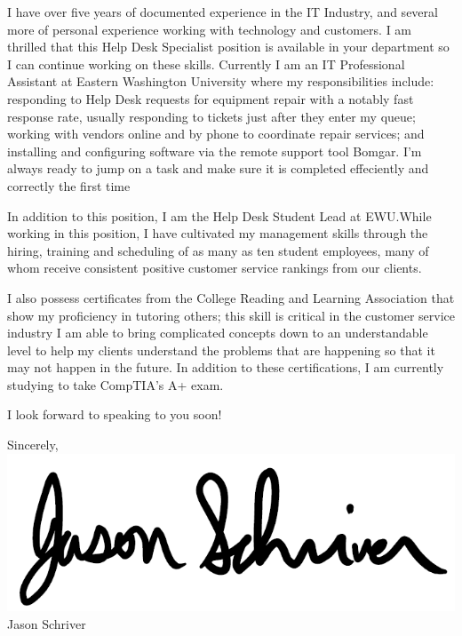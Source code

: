 \documentclass[a4paper,10pt]{article}
\begin{document}
\par
I have over five years of documented experience in the IT Industry, and several more of personal experience working with technology and customers. I am thrilled that this Help Desk Specialist position is available in your department so I can continue working on these skills. Currently I am an IT Professional Assistant at Eastern Washington University where my responsibilities include: responding to Help Desk requests for equipment repair with a notably fast response rate, usually responding to tickets just after they enter my queue; working with vendors online and by phone to coordinate repair services; and installing and configuring software via the remote support tool Bomgar. I'm always ready to jump on a task and make sure it is completed effeciently and correctly the first time
\par
In addition to this position, I am the Help Desk Student Lead at EWU.While working in this position, I have cultivated my management skills through the hiring, training and scheduling of as many as ten student employees, many of whom receive consistent positive customer service rankings from our clients.
\par
I also possess certificates from the College Reading and Learning Association that show my proficiency in tutoring others; this skill is critical in the customer service industry I am able to bring complicated concepts down to an understandable level to help my clients understand the problems that are happening so that it may not happen in the future. In addition to these certifications, I am currently studying to take CompTIA's A+ exam.
\par
I look forward to speaking to you soon!
\par
Sincerely,\\
\includegraphics[scale=.25]{signature}\\
Jason Schriver

\end{document}
